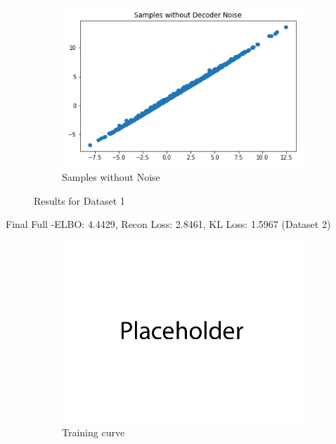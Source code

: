 \documentclass{article}
\begin{document}
\begin{enumerate}[(a)]
\begin{figure}[H]
    \begin{subfigure}{0.32\textwidth}
        \centering
        \includegraphics[width=\textwidth]{figures/q1_a_dset1_sample_without_noise.png}
        \caption{Samples without Noise}
    \end{subfigure}
    \caption{Results for Dataset 1}
\end{figure}
Final Full -ELBO: 4.4429, Recon Loss: 2.8461, KL Loss: 1.5967 (Dataset 2)
\begin{figure}[H]
    \centering
    \begin{subfigure}{0.32\textwidth}
        \centering
        \includegraphics[width=\textwidth]{figures/q1_a_dset2_train_plot.png}
        \caption{Training curve}
    \end{subfigure}
    \begin{subfigure}{0.32\textwidth}

\end{subfigure}
\end{figure}
\end{enumerate}
\end{document}
